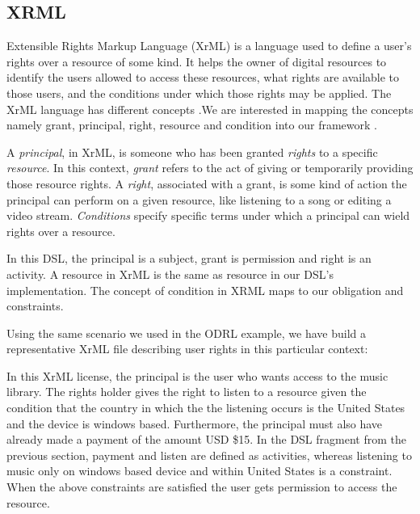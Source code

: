 \subsection{XRML}\label{sec:model-xrml}
Extensible Rights Markup Language (XrML) is a language used to define a user's rights over a resource of some kind. It helps the owner of digital resources to identify the users allowed to access these resources, what rights are available to those users, and the conditions under which those rights may be applied. The XrML language has different concepts .We are interested in mapping the concepts namely grant, principal, right, resource and condition into our framework \cite{XrML-spec}.

A \emph{principal}, in XrML, is someone who has been granted \emph{rights} to a specific \emph{resource}.  In this context, \emph{grant} refers to the act of giving or temporarily providing those resource rights.  A \emph{right}, associated with a grant, is some kind of action the principal can perform on a given resource, like listening to a song or editing a video stream.  \emph{Conditions} specify specific terms under which a principal can wield rights over a resource.

In this DSL, the principal is a subject, grant is permission and right is an activity. A resource in XrML is the same as resource in our DSL's implementation. The concept of condition in XRML maps to our obligation and constraints.

Using the same scenario we used in the ODRL example, we have build a representative XrML file describing user rights in this particular context:



In this XrML license, the principal is the user who wants access to the music library. The rights holder gives the right to listen to a resource given the condition that the country in which the the listening occurs is the United States and the device is windows based. Furthermore, the principal must also have already made a payment of the amount USD \$15.  In the DSL fragment from the previous section, payment and listen are defined as activities, whereas listening to music only on windows based device and within United States is a constraint. When the above constraints are satisfied the user gets permission to access the resource.
